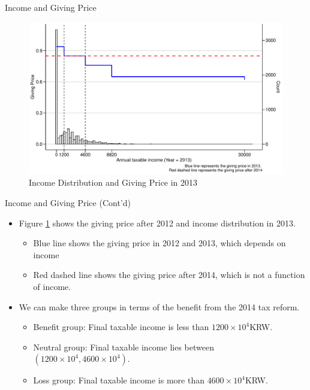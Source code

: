 \documentclass[
  ignorenonframetext,
]{beamer}
\providecommand{\tightlist}{%
  \setlength{\itemsep}{0pt}\setlength{\parskip}{0pt}}
\begin{document}
\begin{frame}{Income and Giving Price}
\protect\hypertarget{income-and-giving-price}{}
\begin{figure}[t]

{\centering \includegraphics[width=0.9\linewidth]{slides_files/figure-beamer/SummaryPriceChange-1} 

}

\caption{Income Distribution and Giving Price in 2013}\label{fig:SummaryPriceChange}
\end{figure}
\end{frame}

\begin{frame}{Income and Giving Price (Cont'd)}
\protect\hypertarget{income-and-giving-price-contd}{}
\begin{itemize}
\tightlist
\item
  Figure \ref{fig:SummaryPriceChange} shows the giving price after 2012 and income distribution in 2013.

  \begin{itemize}
  \tightlist
  \item
    Blue line shows the giving price in 2012 and 2013, which depends on income
  \item
    Red dashed line shows the giving price after 2014, which is not a function of income.
  \end{itemize}
\item
  We can make three groups in terms of the benefit from the 2014 tax reform.

  \begin{itemize}
  \tightlist
  \item
    Benefit group: Final taxable income is less than \(1200 \times 10^4\)KRW.
  \item
    Neutral group: Final taxable income lies between \((1200 \times 10^4, 4600 \times 10^4)\).
  \item
    Loss group: Final taxable income is more than \(4600 \times 10^4\)KRW.
  \end{itemize}
\end{itemize}
\end{frame}
\end{document}
